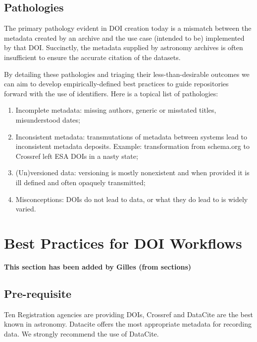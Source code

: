 \documentclass[11pt,a4paper]{ivoa}
\begin{document}
\subsection{Pathologies}
\label{sec:use:patho}

The primary pathology evident in DOI creation today is a mismatch between the metadata created by an archive and the use case (intended to be) implemented by that DOI. 
Succinctly, the metadata supplied by astronomy archives is often insufficient to ensure the accurate citation of the datasets.

By detailing these pathologies and triaging their less-than-desirable outcomes we can aim to develop empirically-defined best practices to guide repositories forward with the use of identifiers.
Here is a topical list of pathologies:

\begin{enumerate}
	\item Incomplete metadata: missing authors, generic or misstated titles, misunderstood dates;
	\item Inconsistent metadata: transmutations of metadata between systems lead to inconsistent metadata deposits. Example: transformation from schema.org to Crossref left ESA DOIs in a nasty state;
	\item (Un)versioned data: versioning is mostly nonexistent and when provided it is ill defined and often opaquely transmitted;
	\item Misconceptions: DOIs do not lead to data, or what they do lead to is widely varied.
\end{enumerate}



\section{Best Practices for DOI Workﬂows}
\textbf{\color{red}This section has been added by Gilles (from sections)}

\subsection{Pre-requisite}
Ten Registration agencies are providing DOIs, Crossref and DataCite are the best known in astronomy. 
Datacite offers the most appropriate metadata for recording data. We strongly recommend the use of DataCite.\\
\end{document}
